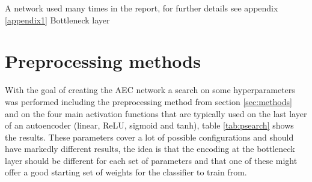 \begin{table}[h!]
{    \caption{A network used many times in the report, for further details see appendix \ref{appendix1} \label{tab:net2}
    \newline *Bottleneck layer}
    }
    \end{table}

    \newpage
    \section{Preprocessing methods} \label{sec:psearch}

      With the goal of creating the AEC network a search on some hyperparameters was performed
      including the preprocessing method from section \ref{sec:methods} and on the four main activation functions
      that are typically used on the last layer of an autoencoder (linear, ReLU, sigmoid and tanh), table \ref{tab:psearch} shows the results.
      These parameters cover a lot of possible configurations and should have markedly different results, the idea
      is that the encoding at the bottleneck layer should be different for each set of parameters and that
      one of these might offer a good starting set of weights for the classifier to train from.

